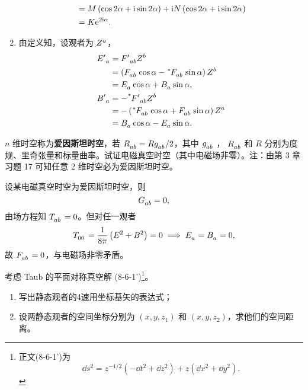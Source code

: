 \begin{xiti}
\begin{zm}
\begin{enumerate}[label = (\alph*)]
\begin{equation*}
\begin{split}
					&= M \left( \cos 2\alpha + \mathrm{i} \sin 2 \alpha \right) + \mathrm{i} N \left( \cos 2 \alpha + \mathrm{i} \sin 2 \alpha \right)\\
					&= K \mathrm{e}^{2\mathrm{i} \alpha}.
				\end{split}
			\end{equation*}
			\item 由定义知，设观者为 $\tensor{Z}{^a}$，
			\begin{align*}
				\tensor{{E'}}{_a} &= \tensor{{F'}}{_a_b} \tensor{Z}{^b}\\
				&= \left( \tensor{F}{_a_b} \cos \alpha - \tensor[^*]{F}{_a_b} \sin \alpha \right) \tensor{Z}{^b}\\
				&= \tensor{E}{_a} \cos \alpha + \tensor{B}{_a} \sin \alpha,\\
				\tensor{{B'}}{_a} &= - \tensor[^*]{{F'}}{_a_b} \tensor{Z}{^b}\\
				&= - \left( \tensor[^*]{F}{_a_b} \cos \alpha + \tensor{F}{_a_b} \sin \alpha \right) \tensor{Z}{^a}\\
				&= \tensor{B}{_a} \cos \alpha - \tensor{E}{_a} \sin \alpha.
			\end{align*}
		\end{enumerate}
	\end{zm}

	\item $n$ 维时空称为\textbf{爱因斯坦时空}，若 $\tensor{R}{_a_b} = R \tensor{g}{_a_b}/2$，其中 $\tensor{g}{_a_b}$ ， $\tensor{R}{_a_b}$ 和 $R$ 分别为度规、里奇张量和标量曲率。试证电磁真空时空（其中电磁场非零）。注：由第 3 章习题 17 可知任意 2 维时空必为爱因斯坦时空。

	\begin{zm}
		设某电磁真空时空为爱因斯坦时空，则
		\begin{equation*}
			\tensor{G}{_a_b} = 0,
		\end{equation*}
		由场方程知 $\tensor{T}{_a_b} = 0$。但对任一观者
		\begin{equation*}
			\tensor{T}{_0_0} = \frac{1}{8\pi} \left( E^2 + B^2 \right) = 0 \implies \tensor{E}{_a} = \tensor{B}{_a} = 0,
		\end{equation*}
		故 $\tensor{F}{_a_b} = 0$，与电磁场非零矛盾。
	\end{zm}

	\item 考虑 Taub 的平面对称真空解 (8-6-1')\footnote{正文(8-6-1')为
	\begin{equation*}
		\dd{s}^2 = z^{-1/2} \left( -\dd{t}^2 + \dd{z}^2 \right) + z \left( \dd{x}^2 + \dd{y}^2 \right). \tag{8-6-1'}
	\end{equation*}
	}。
	\begin{enumerate}[label=(\alph*)]
		\item 写出静态观者的4速用坐标基矢的表达式；
		\item 设两静态观者的空间坐标分别为 $(x,y,z_1)$ 和 $(x,y,z_2)$，求他们的空间距离。
	\end{enumerate}


\end{xiti}
